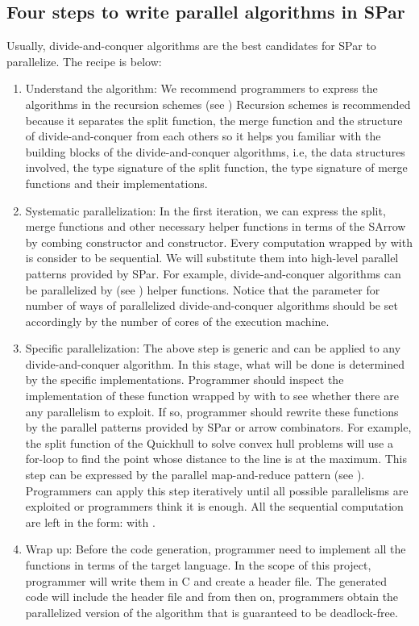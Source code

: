 \subsection{Four steps to write parallel algorithms in SPar}
Usually, divide-and-conquer algorithms are the best candidates for SPar to parallelize. The recipe is below:
\begin{enumerate}
    \item Understand the algorithm: We recommend programmers to express the algorithms in the recursion schemes (see ) Recursion schemes is recommended because it separates the split function, the merge function and the structure of divide-and-conquer from each others so it helps you familiar with the building blocks of the divide-and-conquer algorithms, i.e, the data structures involved, the type signature of the split function, the type signature of merge functions and their implementations.
    \item Systematic parallelization: In the first iteration, we can express the split, merge functions and other necessary helper functions in terms of the SArrow by combing  constructor and  constructor. Every computation wrapped by  with  is consider to be sequential. We will substitute them into high-level parallel patterns provided by SPar. For example, divide-and-conquer algorithms can be parallelized by  (see ) helper functions. Notice that the parameter for number of ways of parallelized divide-and-conquer algorithms should be set accordingly by the number of cores of the execution machine.
    \item Specific parallelization: The above step is generic and can be applied to any divide-and-conquer algorithm. In this stage, what will be done is determined by the specific implementations. Programmer should inspect the implementation of these function wrapped by  with  to see whether there are any parallelism to exploit. If so, programmer should rewrite these functions by the parallel patterns provided by SPar or arrow combinators. For example, the split function of the Quickhull \cite{Quickhull2019} to solve convex hull problems will use a for-loop to find the point whose distance to the line is at the maximum. This step can be expressed by the parallel map-and-reduce pattern (see ). Programmers can apply this step iteratively until all possible parallelisms are exploited or programmers think it is enough. All the sequential computation are left in the form:  with .
    \item Wrap up: Before the code generation, programmer need to implement all the  functions in terms of the target language. In the scope of this project, programmer will write them in C and create a header file. The generated code will include the header file and from then on, programmers obtain the parallelized version of the algorithm that is guaranteed to be deadlock-free.
\end{enumerate}
